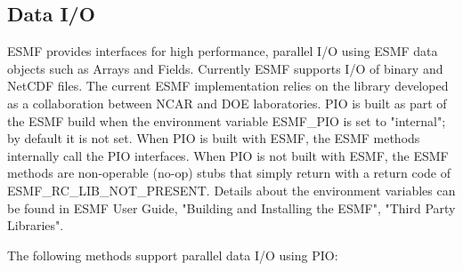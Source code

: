 %
%
%
%
%
%

\subsection{Data I/O}
\label{io:dataio}

\begin{sloppypar}
ESMF provides interfaces for high performance, parallel I/O using ESMF data
objects such as Arrays and Fields.  Currently ESMF supports I/O of binary and
NetCDF files.  The current ESMF implementation relies on the 
library developed as a collaboration between NCAR and DOE laboratories.  PIO
is built as part of the ESMF build when the environment variable ESMF\_PIO is
set to "internal"; by default it is not set. When PIO is built with ESMF, the
ESMF methods internally call the PIO interfaces.  When PIO is not built with
ESMF, the ESMF methods are non-operable (no-op) stubs that simply return with
a return code of ESMF\_RC\_LIB\_NOT\_PRESENT.  Details about the environment
variables can be found in ESMF User Guide, "Building and Installing the ESMF",
"Third Party Libraries".
\end{sloppypar}

The following methods support parallel data I/O using PIO:

